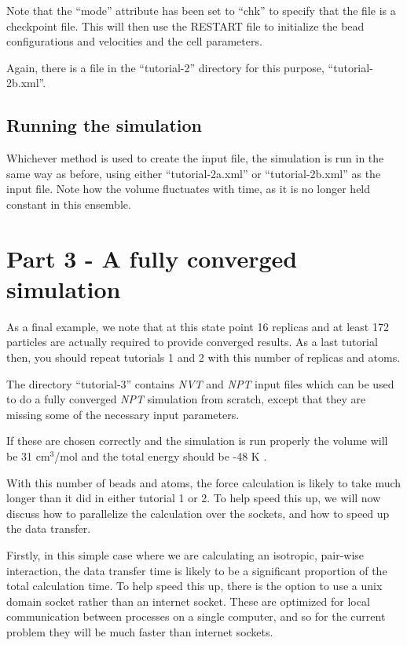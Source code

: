 \documentclass[11pt,english,fleqn]{report}
\begin{document}
Note that the {}``mode'' attribute has been set to {}``chk''
to specify that the file is a checkpoint file.
This will then use the RESTART file to initialize the bead
configurations and velocities and the cell parameters.

Again, there is a file in the {}``tutorial-2'' directory
for this purpose, {}``tutorial-2b.xml''.

\subsection{Running the simulation}

Whichever method is used to create the input file, the simulation
is run in the same way as before, using either
{}``tutorial-2a.xml'' or {}``tutorial-2b.xml'' as the input file. 
Note how the volume fluctuates with time, as it is no longer held
constant in this ensemble.

\section{Part 3 - A fully converged simulation}

As a final example, we note that at this state point 16 replicas
and at least 172 particles are actually 
required to provide converged results.
As a last tutorial then, you should repeat tutorials 1 and 2 with
this number of replicas and atoms. 

The directory {}``tutorial-3'' contains 
\emph{NVT} and \emph{NPT} input files which can be used to do a fully converged
\emph{NPT} simulation from scratch, except that they are missing some
of the necessary input parameters.

If these are chosen correctly and the simulation is run properly
the volume will be 31 \(\textrm{cm}^3\)/mol and the total energy
should be -48 K \cite{mart+99jcp}.

With this number of beads and atoms, the force calculation is likely
to take much longer than it did in either tutorial 1 or 2.
To help speed this up, we will now discuss how to parallelize the
calculation over the sockets, and how to speed up the data transfer.

Firstly, in this simple case where we are calculating an isotropic,
pair-wise interaction, the data transfer time is likely to be a
significant proportion of the total calculation time. To help speed this
up, there is the option to use a unix domain socket rather than an
internet socket. These are optimized for local communication between 
processes on a single computer, and so for the current problem they will be much
faster than internet sockets.
\end{document}
